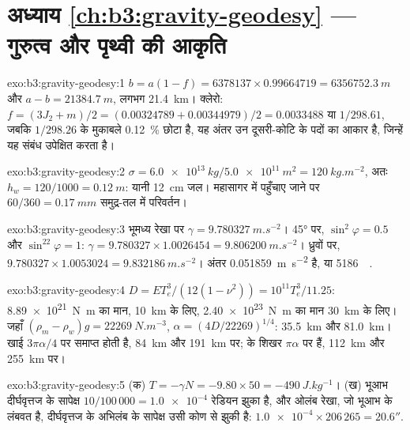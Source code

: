 \section*{अध्याय \ref{ch:b3:gravity-geodesy} --- गुरुत्व और पृथ्वी की आकृति}

\begin{solution}{exo:b3:gravity-geodesy:1}
$b = a(1 - f) = 6378137\times0.99664719 = \qty{6356752.3}{m}$ और
$a - b = \qty{21384.7}{m}$, लगभग \qty{21.4}{km}। क्लेरो:
$f = (3J_2 + m)/2 = (0.00324789 + 0.00344979)/2 = \num{0.0033488}$ या
$1/298.61$, जबकि $1/298.26$ के मुकाबले \qty{0.12}{\percent} छोटा है, यह अंतर उन
दूसरी-कोटि के पदों का आकार है, जिन्हें यह संबंध उपेक्षित करता है।
\end{solution}

\begin{solution}{exo:b3:gravity-geodesy:2}
$\sigma = \qty{6.0e13}{kg}/\qty{5.0e11}{m^2} = \qty{120}{kg.m^{-2}}$, अतः
$h_w = 120/1000 = \qty{0.12}{m}$: यानी \qty{12}{cm} जल। महासागर में पहुँचाए जाने पर
$60/360 = \qty{0.17}{mm}$ समुद्र-तल में परिवर्तन।
\end{solution}

\begin{solution}{exo:b3:gravity-geodesy:3}
भूमध्य रेखा पर $\gamma = \qty{9.780327}{m.s^{-2}}$। \ang{45} पर,
$\sin^2\varphi = 0.5$ और $\sin^22\varphi = 1$: $\gamma = 9.780327\times1.0026454
= \qty{9.806200}{m.s^{-2}}$। ध्रुवों पर, $9.780327\times1.0053024 =
\qty{9.832186}{m.s^{-2}}$। अंतर \qty{0.051859}{m.s^{-2}} है, या
\qty{5186}{\milli\gal}.
\end{solution}

\begin{solution}{exo:b3:gravity-geodesy:4}
$D = ET_e^3/(12(1 - \nu^2)) = 10^{11}T_e^3/11.25$: \qty{8.89e21}{N.m} का मान,
\qty{10}{km} के लिए, \qty{2.40e23}{N.m} का मान \qty{30}{km} के लिए। जहाँ $(\rho_m - \rho_w)g =
\qty{22269}{N.m^{-3}}$, $\alpha = (4D/22269)^{1/4}$: \qty{35.5}{km} और
\qty{81.0}{km}। खाई $3\pi\alpha/4$ पर समाप्त होती है, \qty{84}{km} और \qty{191}{km} पर;
 के शिखर $\pi\alpha$ पर हैं, \qty{112}{km} और \qty{255}{km} पर।
\end{solution}

\begin{solution}{exo:b3:gravity-geodesy:5}
(क) $T = -\gamma N = -9.80\times50 = \qty{-490}{J.kg^{-1}}$। (ख) भूआभ
दीर्घवृत्तज के सापेक्ष $10/100\,000 = \num{1.0e-4}$ रेडियन झुका है, और ओलंब रेखा,
जो भूआभ के लंबवत है, दीर्घवृत्तज के अभिलंब के सापेक्ष उसी कोण से झुकी है:
$\num{1.0e-4}\times206\,265 = 20.6''$.
\end{solution}

